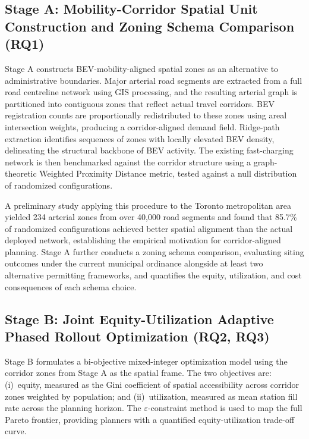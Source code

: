 \documentclass[12pt,letterpaper]{article}
\begin{document}
\subsection{Stage A: Mobility-Corridor Spatial Unit Construction and
  Zoning Schema Comparison (RQ1)}

Stage A constructs BEV-mobility-aligned spatial zones as an alternative
to administrative boundaries.  Major arterial road segments are extracted
from a full road centreline network using GIS processing, and the
resulting arterial graph is partitioned into contiguous zones that reflect
actual travel corridors.  BEV registration counts are proportionally
redistributed to these zones using areal intersection weights, producing
a corridor-aligned demand field.  Ridge-path extraction identifies
sequences of zones with locally elevated BEV density, delineating the
structural backbone of BEV activity.  The existing fast-charging network
is then benchmarked against the corridor structure using a graph-theoretic
Weighted Proximity Distance metric, tested against a null distribution of
randomized configurations.

A preliminary study applying this procedure to the Toronto metropolitan
area yielded 234 arterial zones from over 40,000 road segments and found
that 85.7\% of randomized configurations achieved better spatial alignment
than the actual deployed network, establishing the empirical motivation
for corridor-aligned planning.  Stage A further conducts a zoning schema
comparison, evaluating siting outcomes under the current municipal
ordinance alongside at least two alternative permitting frameworks, and
quantifies the equity, utilization, and cost consequences of each schema
choice.

\subsection{Stage B: Joint Equity-Utilization Adaptive Phased Rollout
  Optimization (RQ2, RQ3)}

Stage B formulates a bi-objective mixed-integer optimization model using
the corridor zones from Stage A as the spatial frame.  The two objectives
are: (i)~equity, measured as the Gini coefficient of spatial
accessibility across corridor zones weighted by population; and
(ii)~utilization, measured as mean station fill rate across the planning
horizon.  The $\varepsilon$-constraint method is used to map the full
Pareto frontier, providing planners with a quantified equity-utilization
trade-off curve.
\end{document}
